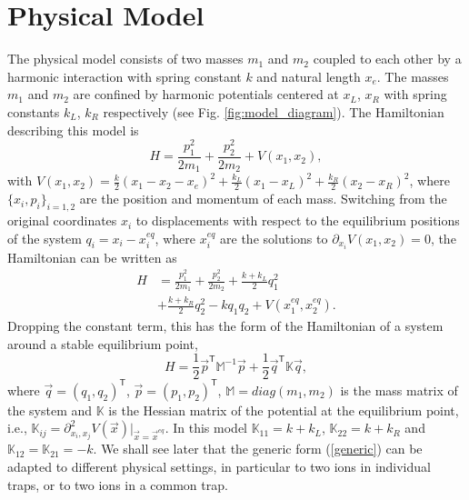 \section{Physical Model \label{sec:Physical_Model}}
%
%
%
%
The physical model consists of two masses $m_1$ and $m_2$ coupled to each other by a harmonic interaction with spring constant $k$ and natural length $x_e$. The masses $m_1$ and $m_2$ are confined by  harmonic potentials centered at $x_L$, $x_R$ with spring constants $k_L$, $k_R$  respectively (see Fig. \ref{fig:model_diagram}). The Hamiltonian describing this model is
%
\begin{equation}
  H = \frac{p_1^2}{2m_1} + \frac{p_2^2}{2m_2} + V(x_1,x_2),
  \label{eq:chapter6_HamiltonianOriginalCordinates}
\end{equation}
%
with $V(x_1,x_2)=\frac{k}{2}\left( x_1 - x_2 - x_e \right)^2 + \frac{k_L}{2}\left( x_1 - x_L \right)^2 + \frac{k_R}{2}\left( x_2 - x_R \right)^2$,  where $\{x_i,p_i\}_{i=1,2}$ are the position and momentum of each mass. Switching from the original coordinates $x_i$ to displacements with respect to the equilibrium positions of the system $q_i = x_i - x_i^{eq}$, where $x_i^{eq}$ are the solutions to $\partial_{x_i}V(x_1,x_2)=0$, the Hamiltonian can be written as
%
\begin{align}
  H &= \frac{p_1^2}{2m_1} + \frac{p_2^2}{2m_2} + \frac{k+k_L}{2}q_1^2\nonumber\\ &+ \frac{k+k_R}{2}q_2^2 - k q_1 q_2 + V(x_1^{eq},x_2^{eq}).
  \label{eq:chapter6_Hamiltonian}
\end{align}
%
Dropping the constant term, this has the form of  the Hamiltonian of a system around a stable equilibrium point,
%
\begin{equation}
  H = \frac{1}{2} \overrightarrow{p}^\mathsf{T}\mathbb{M}^{-1}\overrightarrow{p} + \frac{1}{2} \overrightarrow{q}^\mathsf{T}\mathbb{K}\overrightarrow{q},
\label{generic}
\end{equation}
%
where $\overrightarrow{q} = \left(q_1,q_2\right)^\mathsf{T}$, $\overrightarrow{p} = \left(p_1,p_2\right)^\mathsf{T}$, $\mathbb{M} = diag(m_1,m_2)$ is the mass matrix of the system and $\mathbb{K}$ is the Hessian matrix of the potential at the equilibrium point, i.e., $\mathbb{K}_{ij} = \partial^2_{x_i,x_j}V(\overrightarrow{x})\Big|_{\overrightarrow{x} = \overrightarrow{x}^{eq}}$. In this model  $\mathbb{K}_{11} = k + k_L$, $\mathbb{K}_{22} = k + k_R$ and $\mathbb{K}_{12} = \mathbb{K}_{21} = -k$.
We shall see later that
the generic form (\ref{generic}) can be adapted to different physical settings, in particular to
two ions in individual traps, or to two ions in a common trap.

